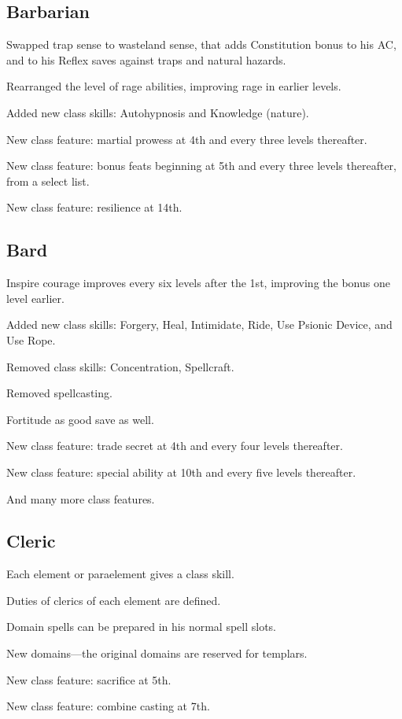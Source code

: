 \subsection{Barbarian}
\begin{itemize*}
\item Swapped trap sense to wasteland sense, that adds Constitution bonus to his AC, and to his Reflex saves against traps and natural hazards.
\item Rearranged the level of rage abilities, improving rage in earlier levels.
\item Added new class skills: Autohypnosis and Knowledge (nature).
\item New class feature: martial prowess at 4th and every three levels thereafter.
\item New class feature: bonus feats beginning at 5th and every three levels thereafter, from a select list.
\item New class feature: resilience at 14th.
\end{itemize*}

\subsection{Bard}
\begin{itemize*}
\item Inspire courage improves every six levels after the 1st, improving the bonus one level earlier.
\item Added new class skills: Forgery, Heal, Intimidate, Ride, Use Psionic Device, and Use Rope.
\item Removed class skills: Concentration, Spellcraft.
\item Removed spellcasting.
\item Fortitude as good save as well.
\item New class feature: trade secret at 4th and every four levels thereafter.
\item New class feature: special ability at 10th and every five levels thereafter.
\item And many more class features.
\end{itemize*}

\subsection{Cleric}
\begin{itemize*}
\item Each element or paraelement gives a class skill.
\item Duties of clerics of each element are defined.
\item Domain spells can be prepared in his normal spell slots.
\item New domains---the original domains are reserved for templars.
\item New class feature: sacrifice at 5th.
\item New class feature: combine casting at 7th.
\end{itemize*}

